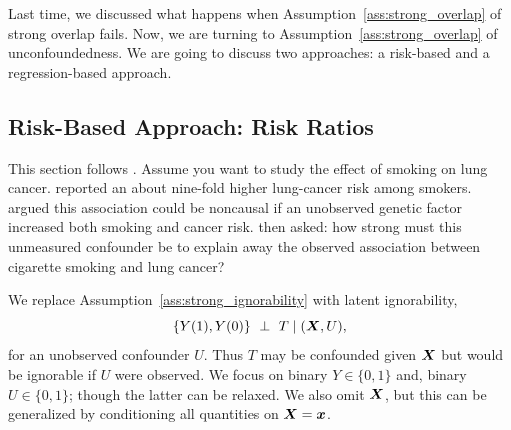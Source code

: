 \documentclass[11pt]{exam}
\begin{document}
Last time, we discussed what happens when Assumption~\ref{ass:strong_overlap} of strong overlap fails. Now, we are turning to  Assumption~\ref{ass:strong_overlap} of unconfoundedness. We are going to discuss two approaches: a risk-based and a regression-based approach.

\subsection{Risk-Based Approach: Risk Ratios}
This section follows \citep{ding2016sensitivity, ding2023coursecausalinference, chazal2024causalcoursenotes}.
Assume you want to study the effect of smoking on lung cancer. \citet{doll1950smoking} reported an about nine-fold higher lung-cancer risk among smokers. \citet{fisher1957dangers} argued this association could be noncausal if an unobserved genetic factor increased both smoking and cancer risk. \citet{cornfield1959smoking} then asked: how strong must this unmeasured confounder be to explain away the observed association between cigarette smoking and lung cancer?

We replace Assumption~\ref{ass:strong_ignorability} with latent ignorability,
\[
\{Y(1),Y(0)\}\ \perp\ T \mid (\bX,U),
\]
for an unobserved confounder $U$. Thus $T$ may be confounded given $\bm{X}$ but would be ignorable if $U$ were observed. We focus on binary $Y\in\{0,1\}$ and, binary $U\in\{0,1\}$; though the latter can be relaxed. We also omit $\bm{X}$, but this can be generalized by conditioning all quantities on $\bm{X} = \bm{x}$.
\end{document}
